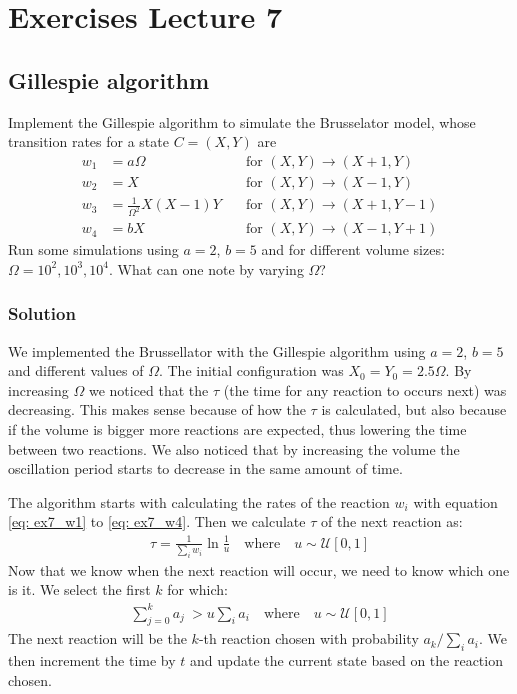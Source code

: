 \documentclass[../main.tex]{subfiles}
\begin{document}
\chapter{Exercises Lecture 7}


\section{Gillespie algorithm}

Implement the Gillespie algorithm to simulate the Brusselator model, whose transition rates for a state $C = (X, Y )$ are
\begin{align}
w_1 &= a\Omega \quad &\text{for } (X, Y ) \rightarrow (X + 1, Y ) \label{eq: ex7_w1} \\
w_2 &= X \quad &\text{for } (X, Y ) \rightarrow (X - 1, Y ) \\
w_3 &= \frac{1}{\Omega^2} X(X - 1)Y \quad &\text{for } (X, Y ) \rightarrow (X + 1, Y - 1) \\
w_4 &= bX \quad &\text{for } (X, Y ) \rightarrow (X - 1, Y + 1) \label{eq: ex7_w4}
\end{align}
Run some simulations using $a = 2$, $b = 5$ and for different volume sizes: $\Omega = 10^2, 10^3, 10^4$. What can one note by varying $\Omega$?


\subsection{Solution}
We implemented the Brussellator with the Gillespie algorithm using $a=2$, $b=5$ and different values of $\Omega$. The initial configuration was $X_0=Y_0=2.5\Omega$. By increasing $\Omega$ we noticed that the $\tau$ (the time for any reaction to occurs next) was decreasing. This makes sense because of how the $\tau$ is calculated, but also because if the volume is bigger more reactions are expected, thus lowering the time between two reactions.  We also noticed that by increasing the volume the oscillation period starts to decrease in the same amount of time.

\noindent The algorithm starts with calculating the rates of the reaction $w_i$ with equation \eqref{eq: ex7_w1} to \eqref{eq: ex7_w4}. Then we calculate $\tau$ of the next reaction as:
\begin{align}
    \tau = \frac{1}{\sum_i w_i}\ln{\frac{1}{u}}\quad\text{where}\quad u \sim \mathcal{U}[0, 1]
\end{align}
Now that we know when the next reaction will occur, we need to know which one is it. We select the first $k$ for which:
\begin{align}
    \sum_{j=0}^k a_j\ > u\sum_i a_i\quad\text{where}\quad u \sim \mathcal{U}[0, 1]
\end{align}
The next reaction will be the $k$-th reaction chosen with probability $a_k / \sum_i a_i$. We then increment the time by $t$ and update the current state based on the reaction chosen.
\end{document}

